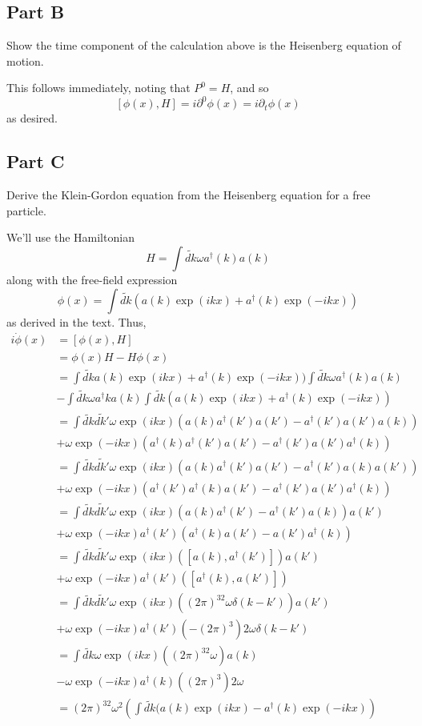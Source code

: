 \documentclass[fontsize=11pt]{scrartcl} %
\numberwithin{equation}{section} %
\numberwithin{figure}{section} %
\numberwithin{table}{section} %
\newcommand{\ad}{a^{\dagger}}
\begin{document}
\subsection*{Part B}
Show the time component of the calculation above is the Heisenberg equation of
motion.

This follows immediately, noting that $P^0 = H$, and so
\[
    [\phi(x),H] = i\partial^0\phi(x) = i\partial_t\phi(x)
\]
as desired.


\subsection*{Part C}
Derive the Klein-Gordon equation from the Heisenberg equation for a free
particle.

We'll use the Hamiltonian
\[
    H = \int \tilde{dk}\omega \ad(k)a(k)
\]
along with the free-field expression
\[
    \phi(x) = \int \tilde{dk}(a(k)\exp(ikx) + \ad(k)\exp(-ikx))
\]
as derived in the text. Thus,
\[
    \begin{aligned}
        i\dot{\phi}(x) &= [\phi(x),H]\\
        &= \phi(x)H - H\phi(x)\\
        &= \int\tilde{dk}a(k)\exp(ikx) +
        \ad(k)\exp(-ikx))\int\tilde{dk}\omega\ad(k)a(k)\\
        &- \int\tilde{dk}\omega\ad{k}a(k)\int\tilde{dk}(a(k)\exp(ikx) +
        \ad(k)\exp(-ikx))\\
        &=\int
        \tilde{dk}\tilde{dk'}\omega\exp(ikx)(a(k)\ad(k')a(k')-\ad(k')a(k')a(k))\\
            &+\omega\exp(-ikx)(\ad(k)\ad(k')a(k') - \ad(k')a(k')\ad(k))\\
        &=\int
        \tilde{dk}\tilde{dk'}\omega\exp(ikx)(a(k)\ad(k')a(k')-\ad(k')a(k)a(k'))\\
            &+\omega\exp(-ikx)(\ad(k')\ad(k)a(k') - \ad(k')a(k')\ad(k))\\
        &=\int
        \tilde{dk}\tilde{dk'}\omega\exp(ikx)(a(k)\ad(k')-\ad(k')a(k))a(k')\\
        &+\omega\exp(-ikx)\ad(k')(\ad(k)a(k') - a(k')\ad(k))\\
        &=\int
        \tilde{dk}\tilde{dk'}\omega\exp(ikx)([a(k),\ad(k')])a(k')\\
        &+\omega\exp(-ikx)\ad(k')([\ad(k),a(k')])\\
        &=\int
        \tilde{dk}\tilde{dk'}\omega\exp(ikx)((2\pi)^32\omega\delta(k-k'))a(k')\\
        &+\omega\exp(-ikx)\ad(k')(-(2\pi)^3)2\omega\delta(k-k')\\
        &=\int
        \tilde{dk}\omega\exp(ikx)((2\pi)^32\omega)a(k)\\
        &-\omega\exp(-ikx)\ad(k)((2\pi)^3)2\omega\\
        &=(2\pi)^32\omega^2\left( \int \tilde{dk}(a(k)\exp(ikx) -
            \ad(k)\exp(-ikx) \right)
    \end{aligned}
\]
\end{document}
